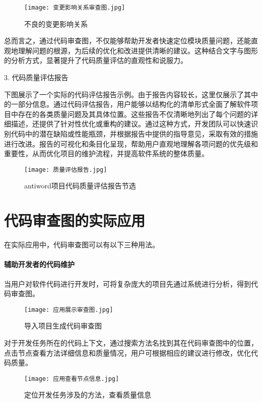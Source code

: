 \begin{figure}[h]
\centering
\texttt{[image: 变更影响关系审查图.jpg]}
\caption{不良的变更影响关系}
\end{figure}


总而言之，通过代码审查图，不仅能够帮助开发者快速定位模块质量问题，还能直观地理解问题的根源，为后续的优化和改进提供清晰的建议。这种结合文字与图形的分析方式，显著提升了代码质量评估的直观性和说服力。

3. 代码质量评估报告

下图展示了一个实际的代码评估报告示例。由于报告内容较长，这里仅展示了其中的一部分信息。通过代码评估报告，用户能够以结构化的清单形式全面了解软件项目中存在的各类质量问题及其具体位置。这些报告不仅清晰地列出了每个问题的详细描述，还提供了针对性优化或重构的建议。通过这种方式，开发团队可以快速识别代码中的潜在缺陷或性能瓶颈，并根据报告中提供的指导意见，采取有效的措施进行改进。报告的可视化和条目化呈现，帮助用户直观地理解各项问题的优先级和重要性，从而优化项目的维护流程，并提高软件系统的整体质量。

\clearpage

\begin{figure}[h]
\centering
\texttt{[image: 质量评估报告.jpg]}
\caption{antiword项目代码质量评估报告节选}
\end{figure}


\section{代码审查图的实际应用}

在实际应用中，代码审查图可以有以下三种用法。

\paragraph{辅助开发者的代码维护} 当用户对软件代码进行开发时，可将复杂庞大的项目先通过系统进行分析，得到代码审查图。

\begin{figure}[h]
\centering
\texttt{[image: 应用展示审查图.jpg]}
\caption{导入项目生成代码审查图}
\end{figure}

对于开发任务所在的代码上下文，通过搜索方法名找到其在代码审查图中的位置，点击节点查看方法详细信息和质量情况，用户可根据相应的建议进行修改，优化代码质量。

\begin{figure}[h]
\centering
\texttt{[image: 应用查看节点信息.jpg]}
\caption{定位开发任务涉及的方法，查看质量信息}
\end{figure}

